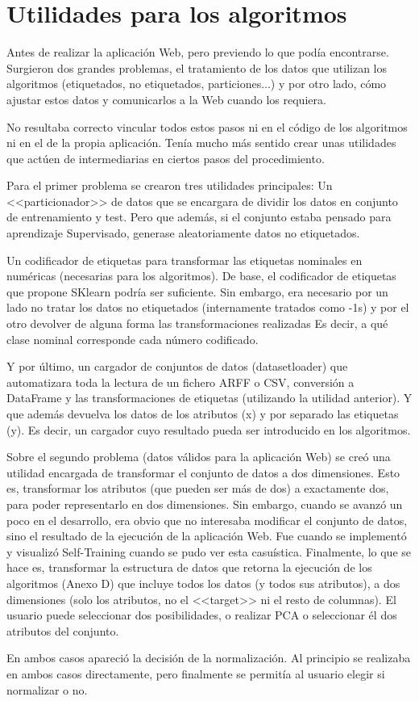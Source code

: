 \section{Utilidades para los algoritmos}

Antes de realizar la aplicación Web, pero previendo lo que podía encontrarse.
Surgieron dos grandes problemas, el tratamiento de los datos que utilizan los
algoritmos (etiquetados, no etiquetados, particiones...) y por otro lado, cómo
ajustar estos datos y comunicarlos a la Web cuando los requiera.

No resultaba correcto vincular todos estos pasos ni en el código de los
algoritmos ni en el de la propia aplicación. Tenía mucho más sentido crear unas
utilidades que actúen de intermediarias en ciertos pasos del procedimiento.

Para el primer problema se crearon tres utilidades principales: Un <<particionador>>
de datos que se encargara de dividir los datos en conjunto de entrenamiento
y test. Pero que además, si el conjunto estaba pensado para aprendizaje
Supervisado, generase aleatoriamente datos no etiquetados.

Un codificador de etiquetas para transformar las etiquetas nominales en
numéricas (necesarias para los algoritmos). De base, el codificador de etiquetas
que propone SKlearn podría ser suficiente. Sin embargo, era necesario por un
lado no tratar los datos no etiquetados (internamente tratados como -1s) y por
el otro devolver de alguna forma las transformaciones realizadas Es decir, a qué
clase nominal corresponde cada número codificado.

Y por último, un cargador de conjuntos de datos (datasetloader) que automatizara
toda la lectura de un fichero ARFF o CSV, conversión a DataFrame y las
transformaciones de etiquetas (utilizando la utilidad anterior). Y que además
devuelva los datos de los atributos (x) y por separado las etiquetas (y). Es
decir, un cargador cuyo resultado pueda ser introducido en los algoritmos. 

Sobre el segundo problema (datos válidos para la aplicación Web) se creó una
utilidad encargada de transformar el conjunto de datos a dos dimensiones. Esto
es, transformar los atributos (que pueden ser más de dos) a exactamente dos,
para poder representarlo en dos dimensiones. Sin embargo, cuando se avanzó un
poco en el desarrollo, era obvio que no interesaba modificar el conjunto de
datos, sino el resultado de la ejecución de la aplicación Web. Fue cuando se
implementó y visualizó Self-Training cuando se pudo ver esta casuística.
Finalmente, lo que se hace es, transformar la estructura de datos que retorna la
ejecución de los algoritmos (Anexo D) que incluye todos los datos (y todos sus
atributos), a dos dimensiones (solo los atributos, no el <<target>> ni el resto
de columnas). El usuario puede seleccionar dos posibilidades, o realizar PCA o
seleccionar él dos atributos del conjunto.

En ambos casos apareció la decisión de la normalización. Al principio se
realizaba en ambos casos directamente, pero finalmente se permitía al usuario
elegir si normalizar o no.